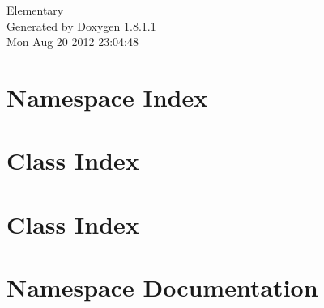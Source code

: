 \documentclass{book}
\begin{document}
\hypersetup{pageanchor=false,citecolor=blue}
\begin{titlepage}
\vspace*{7cm}
\begin{center}
{\Large Elementary }\\
\vspace*{1cm}
{\large Generated by Doxygen 1.8.1.1}\\
\vspace*{0.5cm}
{\small Mon Aug 20 2012 23:04:48}\\
\end{center}
\end{titlepage}
\clearemptydoublepage
{}
\tableofcontents
\clearemptydoublepage
{}
\hypersetup{pageanchor=true,citecolor=blue}
\chapter{Namespace Index}

\chapter{Class Index}

\chapter{Class Index}

\chapter{Namespace Documentation}








\end{document}
